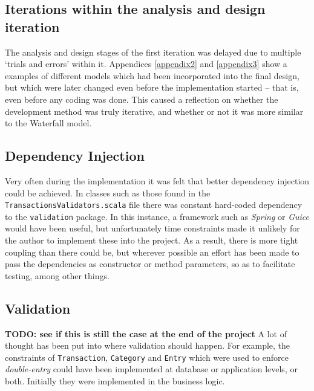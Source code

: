 \subsection{Iterations within the analysis and design iteration}
The analysis and design stages of the first iteration was delayed due to
multiple `trials and errors' within it. Appendices \ref{appendix2} and
\ref{appendix3} show a examples of different models which had been incorporated
into the final design, but which were later changed even before the
implementation started -- that is, even before any coding was done. This caused
a reflection on whether the development method was truly iterative, and whether
or not it was more similar to the Waterfall model.

\subsection{Dependency Injection} \label{sec:Reflections.DependencyInjection}
Very often during the implementation it was felt that better dependency
injection could be achieved. In classes such as those found in the
\texttt{TransactionsValidators.scala} file there was constant hard-coded
dependency to the \texttt{validation} package. In this instance, a framework
such as \emph{Spring} or \emph{Guice} would have been useful, but unfortunately
time constraints made it unlikely for the author to implement these into the
project. As a result, there is more tight coupling than there could be, but
wherever possible an effort has been made to pass the dependencies as
constructor or method parameters, so as to facilitate testing, among other
things.

\subsection{Validation} \label{sec:Reflections.Validation} 
\textbf{TODO: see if this is still the case at the end of the project}
A lot of thought has been put into where validation should happen. For example,
the constraints of \texttt{Transaction}, \texttt{Category} and \texttt{Entry}
which were used to enforce \emph{double-entry} could have been implemented at
database or application levels, or both. Initially they were implemented in the
business logic.

